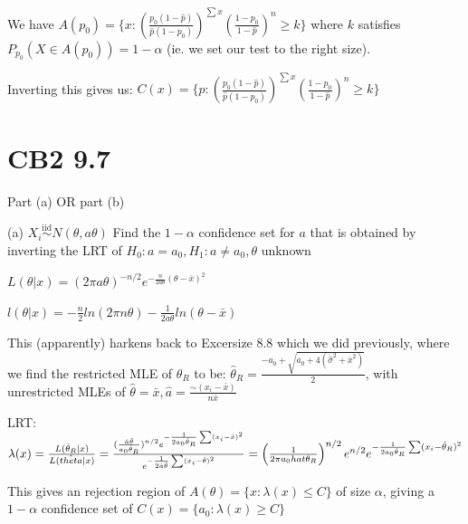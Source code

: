 \documentclass{article}
\let\Oldsum=\sum
\renewcommand{\sum}{\Oldsum\limits}
\newcommand{\iiddist}{\overset{\mathrm{iid}}{\sim}}
\begin{document}
We have $A(p_0) = \{x: (\frac{p_0(1-\hat{p})}{\hat{p}(1-p_0)})^{\sum x}(\frac{1-p_0}{1-\hat{p}})^n \ge k\}$ where $k$ satisfies $P_{p_0}(X \in A(p_0)) = 1-\alpha$ (ie. we set our test to the right size).

Inverting this gives us: $C(x) = \{p: (\frac{p_0(1-\hat{p})}{\hat{p}(1-p_0)})^{\sum x}(\frac{1-p_0}{1-\hat{p}})^n \ge k\}$

\section{CB2 9.7}

Part (a) OR part (b)

(a) $X_i \iiddist N(\theta, a\theta)$ Find the $1-\alpha$ confidence set for $a$ that is obtained by inverting the LRT of $H_0: a = a_0, H_1: a \neq a_0, \theta$ unknown

$L(\theta|x) = (2\pi a\theta)^{-n/2}e^{-\frac{n}{2a\theta}(\theta - \bar{x})^2}$

$l(\theta|x) = -\frac{n}{2}ln(2\pi n\theta) - \frac{1}{2a\theta}ln(\theta - \bar{x})$

This (apparently) harkens back to Excersize 8.8 which we did previously, where we find the restricted MLE of $\theta_R$ to be: $\hat{\theta}_R = \frac{-a_0 + \sqrt{a_0 + 4(\hat{\sigma}^2 + \bar{x}^2)}}{2}$, with unrestricted MLEs of $\hat{\theta} = \bar{x}, \hat{a} = \frac{\sim(x_i - \bar{x})}{n\bar{x}}$

LRT: $\lambda(x) = \frac{L(\hat{\theta}_R|x)}{L(\hat{theta}|x)} = \frac{(\frac{\hat{a}\hat{\theta}}{a_0\hat{\theta}_R})^{n/2}e^{-\frac{1}{2 a_0 \hat{\theta}_R}\sum (x_i -\bar{x})^2}}{e^{-\frac{1}{2\hat{a}\hat{\theta}}\sum (x_i - \hat{\theta})^2}} = \left(\frac{1}{2\pi a_0 \\hat{\theta}_R}\right)^{n/2}e^{n/2} e^{-\frac{1}{2a_0 \hat{\theta}_R}\sum(x_i - \hat{\theta}_R)^2}$

This gives an rejection region of $A(\theta) = \{x: \lambda(x) \le C\}$ of size $\alpha$, giving a $1-\alpha$ confidence set of $C(x) = \{a_0: \lambda(x) \ge C\}$
\end{document}
